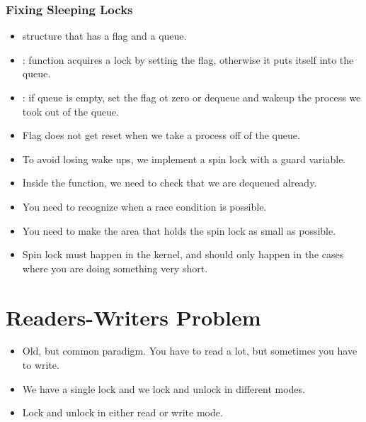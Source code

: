 \documentclass[]{article}
\begin{document}
\subsubsection{Fixing Sleeping Locks}
\begin{itemize}
\item {} structure that has a flag and a queue.
\item {}: function acquires a lock by setting the flag, otherwise it
puts itself into the queue.
\item {}: if queue is empty, set the flag ot zero or dequeue and
wakeup the process we took out of the queue.
\item Flag does not get reset when we take a process off of the queue.
\item To avoid losing wake ups, we implement a spin lock with a guard variable.
\item Inside the  function, we need to check that we are dequeued
already.
\item You need to recognize when a race condition is possible.
\item You need to make the area that holds the spin lock as small as possible.
\item Spin lock must happen in the kernel, and should only happen in the cases
where you are doing something very short.
\end{itemize}

\section{Readers-Writers Problem}
\begin{itemize}
\item Old, but common paradigm. You have to read a lot, but sometimes you have
to write.
\item We have a single lock and we lock and unlock in different modes.
\item Lock and unlock in either read or write mode.
\end{itemize}
\end{document}
